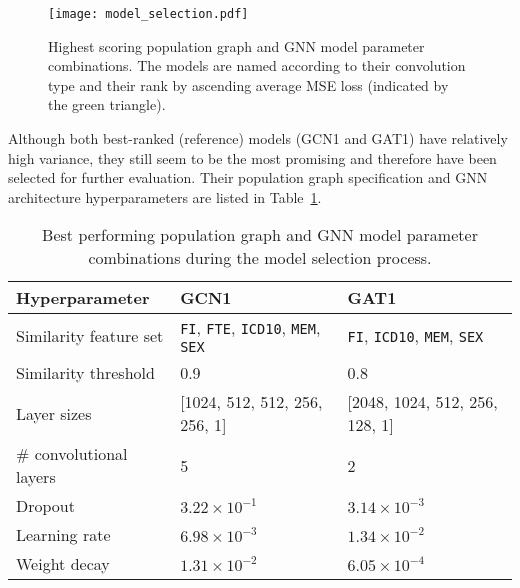 

\begin{figure}[h]
    \centering
    \texttt{[image: model\_selection.pdf]}
    \caption{Highest scoring population graph and GNN model parameter combinations. The models are named according to their convolution type and their rank by ascending average MSE loss (indicated by the green triangle).}\label{figure:gat-gcn-rank}
\end{figure}

Although both best-ranked (reference) models (GCN1 and GAT1) have relatively high variance, they still seem to be the most promising and therefore have been selected for further evaluation. Their population graph specification and GNN architecture hyperparameters are listed in Table~\ref{table:best-hyperparameters}.

\begin{table}[]
    \caption{Best performing population graph and GNN model parameter combinations during the model selection process.}\label{table:best-hyperparameters}
    \centering
    \small
    \begin{tabular}{p{}p{}p{}}
        \hline
    \textbf{Hyperparameter} & \textbf{GCN1} & \textbf{GAT1} \\  \hline
        Similarity feature set & \texttt{FI}, \texttt{FTE}, \texttt{ICD10}, \texttt{MEM}, \texttt{SEX} & \texttt{FI}, \texttt{ICD10}, \texttt{MEM}, \texttt{SEX} \\
        Similarity threshold & 0.9 & 0.8 \\ \hline
        Layer sizes & [1024, 512, 512, 256, 256, 1] & [2048, 1024, 512, 256, 128, 1] \\
        \# convolutional layers & 5 & 2 \\
        Dropout & $3.22 \times 10^{-1}$ & $3.14 \times 10^{-3}$ \\
        Learning rate & $6.98 \times 10^{-3}$ & $1.34 \times 10^{-2}$ \\
        Weight decay & $1.31 \times 10^{-2}$ & $6.05 \times 10^{-4}$ \\ \hline
\end{tabular}
\end{table}

